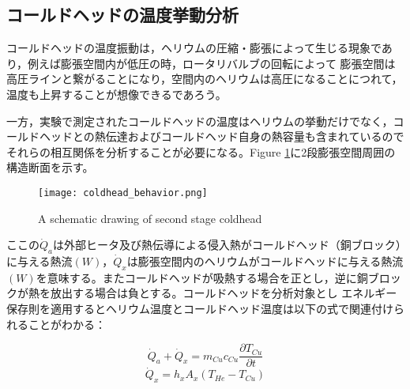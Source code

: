 \subsection{コールドヘッドの温度挙動分析}
コールドヘッドの温度振動は，ヘリウムの圧縮・膨張によって生じる現象であり，例えば膨張空間内が低圧の時，ロータリバルブの回転によって
膨張空間は高圧ラインと繋がることになり，空間内のヘリウムは高圧になることにつれて，温度も上昇することが想像できるであろう。

一方，実験で測定されたコールドヘッドの温度はヘリウムの挙動だけでなく，コールドヘッドとの熱伝達およびコールドヘッド自身の熱容量も含まれているので
それらの相互関係を分析することが必要になる。Figure \ref{fig:coldhead}に2段膨張空間周囲の構造断面を示す。


\begin{figure}[h!]
\begin{center}
\texttt{[image: coldhead\_behavior.png]}
\caption{A schematic drawing of second stage coldhead}
\label{fig:coldhead}
\end{center}
\end{figure}

ここの$\dot Q_a$は外部ヒータ及び熱伝導による侵入熱がコールドヘッド（銅ブロック）に与える熱流$(W)$，$\dot Q_x$は膨張空間内のヘリウムがコールドヘッドに与える熱流$(W)$を意味する。またコールドヘッドが吸熱する場合を正とし，逆に銅ブロックが熱を放出する場合は負とする。コールドヘッドを分析対象とし
エネルギー保存則を適用するとヘリウム温度とコールドヘッド温度は以下の式で関連付けられることがわかる：

\begin{equation}
\dot Q_a + \dot Q_x = m_{Cu} c_{Cu} \frac{\partial T_{Cu}}{\partial t}
\end{equation}
\begin{equation}
\dot Q_x = h_xA_x(T_{He} - T_{Cu})
\end{equation}


